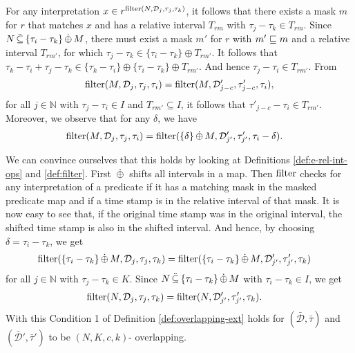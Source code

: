 For any interpretation $x \in r^{\operatorname{filter}(N, \mathcal{D}_j, \tau_j, \tau_k)}$, it follows that there exists a mask $m$ for $r$ that matches $x$ and has a relative interval $T_{rm}$ with $\tau_j - \tau_k \in T_{rm}$.
Since $N \,\ddot{\subseteq}\, \{ \tau_i - \tau_k \} \,\dot{\oplus}\, M$, there must exist a mask $m'$ for $r$ with $m' \sqsubseteq m$ and a relative interval $T_{rm'}$, for which $\tau_j - \tau_k \in \{ \tau_i - \tau_k \} \oplus T_{rm'}$.
It follows that $\tau_k - \tau_i + \tau_j - \tau_k \in \{ \tau_k - \tau_i\} \oplus \{ \tau_i - \tau_k\} \oplus T_{rm'}$.
And hence $\tau_j - \tau_i \in T_{rm'}$.
From
\begin{equation*}
    \operatorname{filter}(M, \mathcal{D}_j, \tau_j, \tau_i)
    = \operatorname{filter}(M, \mathcal{D}'_{j-c}, \tau'_{j-c}, \tau_i),
\end{equation*}
for all $j \in \mathbb{N}$ with $\tau_j - \tau_i \in I$ and $T_{rm'} \subseteq I$, it follows that 
$\tau'_{j-c} - \tau_i \in T_{rm'}$.
Moreover, we observe that for any $\delta$, we have 
\begin{align*}
    \operatorname{filter}(M, \mathcal{D}_j, \tau_j, \tau_i)
    &= \operatorname{filter}(\{ \delta \} \,\dot{\oplus}\, M, \mathcal{D}'_{j'}, \tau'_{j'}, \tau_i - \delta). 
\end{align*}
\iffalse
\begin{align*}
    \filter(\{ \tau_k - \tau_i \} \oplusext M, \mathcal{D}_j, \tau_j, \tau_k - \tau_i + \tau_i)
    &= \filter(\{ \tau_k - \tau_i \} \oplusext M, \mathcal{D}'_{j'}, \tau'_{j'}, \tau_k - \tau_i + \tau_i),
\end{align*}
for all $j \in \mathbb{N}$ with $\tau_j - \tau_k \in K$.
\fi
We can convince ourselves that this holds by looking at Definitions \ref{def:e-rel-int-ops} and \ref{def:filter}.
First $\,\dot{\oplus}\,$ shifts all intervals in a map.
Then $\operatorname{filter}$ checks for any interpretation of a predicate if it has a matching mask in the masked predicate map and if a time stamp is in the relative interval of that mask.
It is now easy to see that, if the original time stamp was in the original interval, the shifted time stamp is also in the shifted interval.
And hence, by choosing $\delta = \tau_i - \tau_k$, we get
\begin{align*}
    \operatorname{filter}(\{ \tau_i - \tau_k \} \,\dot{\oplus}\, M, \mathcal{D}_j, \tau_j, \tau_k)
    &= \operatorname{filter}(\{ \tau_i - \tau_k \} \,\dot{\oplus}\, M, \mathcal{D}'_{j'}, \tau'_{j'}, \tau_k) 
\end{align*}
for all $j \in \mathbb{N}$ with $\tau_j - \tau_k \in K$.
Since $N \,\ddot{\subseteq}\, \{\tau_i - \tau_k \} \,\dot{\oplus}\, M$ with $\tau_i - \tau_k \in I$, 
we get 
\begin{align*}
    \operatorname{filter}(N, \mathcal{D}_j, \tau_j, \tau_k)
    &= \operatorname{filter}(N, \mathcal{D}'_{j'}, \tau'_{j'}, \tau_k).
\end{align*}
With this Condition 1 of Definition \ref{def:overlapping-ext} holds for $(\bar{\mathcal{D}}, \bar{\tau})$ and $(\bar{\mathcal{D}}', \bar{\tau}')$ to be $(N,K,c,k)$- overlapping.

